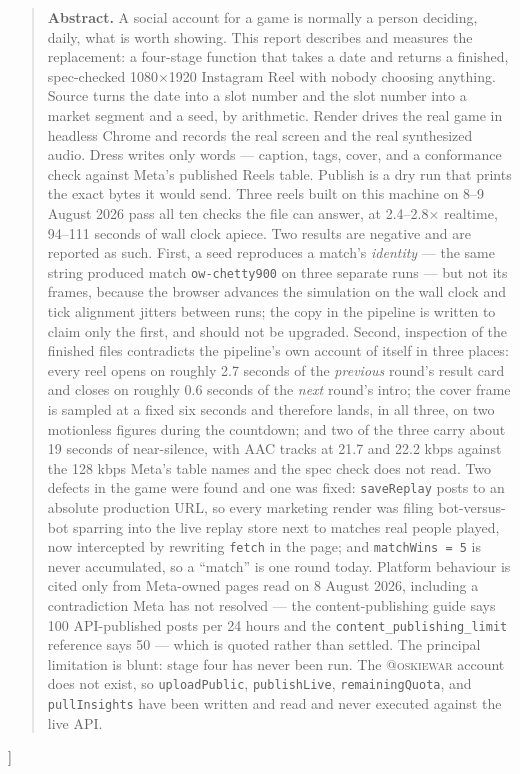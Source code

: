 \documentclass[10pt,letterpaper,twocolumn]{article}
\newcommand{\code}[1]{\texttt{#1}}
\begin{document}
{\begin{quote}
\small\noindent\textbf{Abstract.}
A social account for a game is normally a person deciding, daily, what is worth
showing. This report describes and measures the replacement: a four-stage
function that takes a date and returns a finished, spec-checked 1080$\times$1920
Instagram Reel with nobody choosing anything. Source turns the date into a slot
number and the slot number into a market segment and a seed, by arithmetic.
Render drives the real game in headless Chrome and records the real screen and
the real synthesized audio. Dress writes only words --- caption, tags, cover,
and a conformance check against Meta's published Reels table. Publish is a dry
run that prints the exact bytes it would send. Three reels built on this machine
on 8--9 August 2026 pass all ten checks the file can answer, at 2.4--2.8$\times$
realtime, 94--111 seconds of wall clock apiece. Two results are negative and are
reported as such. First, a seed reproduces a match's \emph{identity} --- the
same string produced match \code{ow-chetty900} on three separate runs --- but
not its frames, because the browser advances the simulation on the wall clock
and tick alignment jitters between runs; the copy in the pipeline is written to
claim only the first, and should not be upgraded. Second, inspection of the
finished files contradicts the pipeline's own account of itself in three places:
every reel opens on roughly 2.7 seconds of the \emph{previous} round's result
card and closes on roughly 0.6 seconds of the \emph{next} round's intro; the
cover frame is sampled at a fixed six seconds and therefore lands, in all three,
on two motionless figures during the countdown; and two of the three carry about
19 seconds of near-silence, with AAC tracks at 21.7 and 22.2 kbps against the
128 kbps Meta's table names and the spec check does not read. Two defects in the
game were found and one was fixed: \code{saveReplay} posts to an absolute
production URL, so every marketing render was filing bot-versus-bot sparring
into the live replay store next to matches real people played, now intercepted
by rewriting \code{fetch} in the page; and \code{matchWins = 5} is never
accumulated, so a ``match'' is one round today. Platform behaviour is cited only
from Meta-owned pages read on 8 August 2026, including a contradiction Meta has
not resolved --- the content-publishing guide says 100 API-published posts per
24 hours and the \code{content\_publishing\_limit} reference says 50 --- which
is quoted rather than settled. The principal limitation is blunt: stage four has
never been run. The \textsc{@oskiewar} account does not exist, so
\code{uploadPublic}, \code{publishLive}, \code{remainingQuota}, and
\code{pullInsights} have been written and read and never executed against the
live API.
\end{quote}
\vspace{0.4em}
}]
\end{document}
